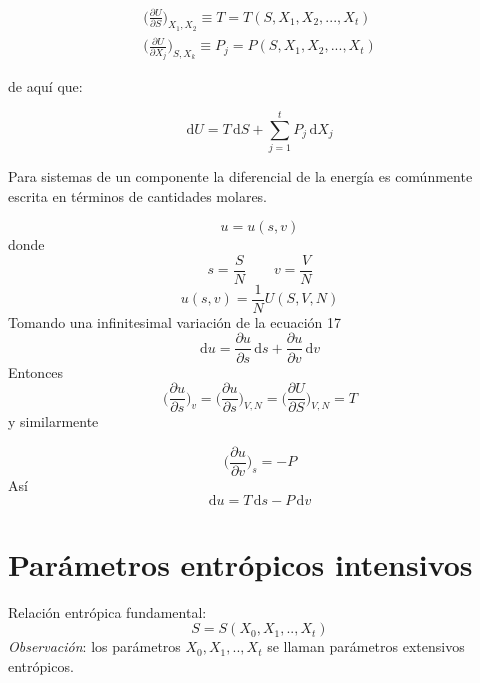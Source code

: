 \documentclass[10pt,twocolumn]{IEEEtran2e}
\newcommand{\ud}{\mathrm{d}}
\begin{document}
\begin{eqnarray}
\bigg(\frac{\partial U}{\partial S}\bigg)_{X_{1},X_{2}}  \equiv  T = T(S,X_{1},X_{2},...,X_{t})\\
\bigg(\frac{\partial U}{\partial X_{j}} \bigg)_{S,X_{k}}  \equiv  P_{j} = P(S,X_{1},X_{2},...,X_{t})
\end{eqnarray}

de aqu\'i que:

\begin{equation}
 \ud U = T \, \ud S + \sum_{j=1}^{t}P_{j} \, \ud X_{j}
\end{equation}

Para sistemas de un componente la diferencial de la energ\'ia es com\'unmente escrita en t\'erminos de cantidades molares.

\begin{equation}
 u=u(s,v)
\end{equation}
donde
\begin{equation}
 s=\frac{S}{N} \qquad v=\frac{V}{N}
\end{equation}
\begin{equation}
 u(s,v)=\frac{1}{N}U(S,V,N)
\end{equation}
Tomando una infinitesimal variaci\'on de la ecuaci\'on 17
\begin{equation}
 \ud u = \frac{\partial u}{\partial s}\,\ud s +\frac{\partial u}{\partial v}\,\ud v
\end{equation}
Entonces
\begin{equation}
 \bigg( \frac{\partial u}{\partial s} \bigg)_{v}=\bigg( \frac{\partial u}{\partial s} \bigg)_{V,N}=\bigg( \frac{\partial U}{\partial S} \bigg)_{V,N}=T
\end{equation}
y similarmente

\begin{equation}
 \bigg( \frac{\partial u}{\partial v} \bigg)_{s}=-P
\end{equation}
As\'i
\begin{equation}
 \ud u = T \, \ud s - P \, \ud v
\end{equation}

\section{Par\'ametros entr\'opicos intensivos}

Relaci\'on entr\'opica fundamental:
\begin{equation}
 S=S(X_{0},X_{1},..,X_{t})
\end{equation}
\textit{Observaci\'on}: los par\'ametros $X_{0},X_{1},..,X_{t}$ se llaman par\'ametros extensivos entr\'opicos.\\
\end{document}
